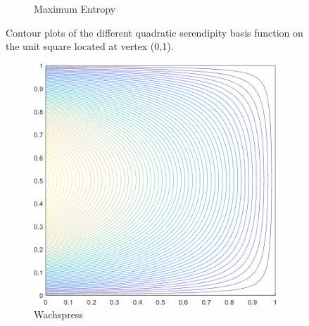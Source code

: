 \begin{figure}
\begin{subfigure}[b]{0.39\textwidth}
		\caption{Maximum Entropy}
	\end{subfigure}
\caption[Contour plots of the quadratic basis functions on the unit square.]{Contour plots of the different quadratic serendipity basis function on the unit square located at vertex (0,1).}
\label{fig::2D_Quadratic_Summary_unit_square_basis_functions_BF4}
\end{figure}

\begin{figure}
\centering
	\begin{subfigure}[b]{0.39\textwidth}
		\centering
		\includegraphics[width=\textwidth]{figures/sec_BF/square_WACHSPRESS2_contour_b8.png}
		\caption{Wachspress}
	\end{subfigure}
	\hspace{1.5cm}
	\begin{subfigure}[b]{0.39\textwidth}
		\centering

\end{subfigure}
\end{figure}
